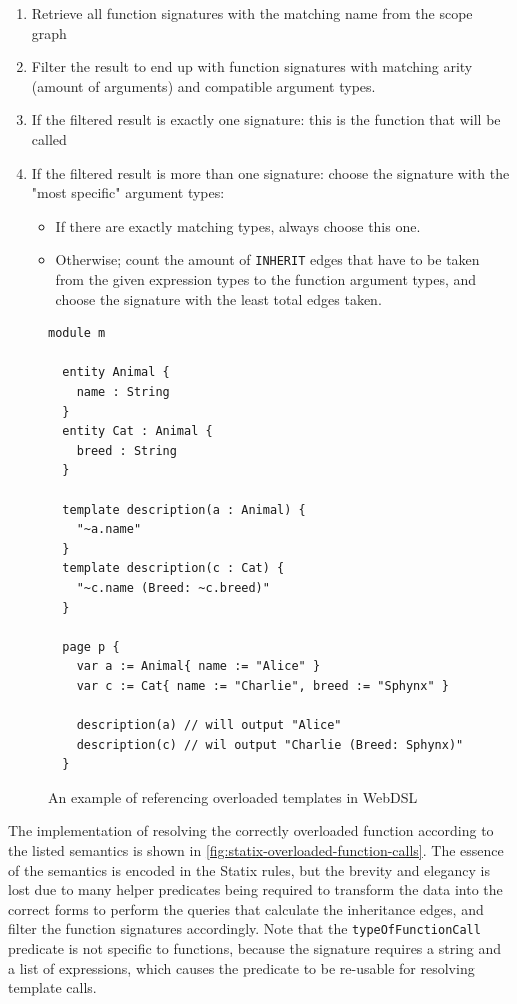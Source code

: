     \begin{enumerate}
      \item Retrieve all function signatures with the matching name from the scope graph
      \item Filter the result to end up with function signatures with matching arity (amount of arguments) and compatible argument types.
      \item If the filtered result is exactly one signature: this is the function that will be called
      \item If the filtered result is more than one signature: choose the signature with the "most specific" argument types:
      \begin{itemize}
        \item If there are exactly matching types, always choose this one.
        \item Otherwise; count the amount of \texttt{INHERIT} edges that have to be taken from the given expression types to the function argument types, and choose the signature with the least total edges taken.
      \end{itemize}
    \end{enumerate}

    \begin{figure}
      \begin{verbatim}
module m

  entity Animal {
    name : String
  }
  entity Cat : Animal {
    breed : String
  }

  template description(a : Animal) {
    "~a.name"
  }
  template description(c : Cat) {
    "~c.name (Breed: ~c.breed)"
  }

  page p {
    var a := Animal{ name := "Alice" }
    var c := Cat{ name := "Charlie", breed := "Sphynx" }

    description(a) // will output "Alice"
    description(c) // wil output "Charlie (Breed: Sphynx)"
  }
      \end{verbatim}
      \caption{\label{fig:template-overloading-referencing-example}An example of referencing overloaded templates in WebDSL}
    \end{figure}

    The implementation of resolving the correctly overloaded function according to the listed semantics is shown in \cref{fig:statix-overloaded-function-calls}. The essence of the semantics is encoded in the Statix rules, but the brevity and elegancy is lost due to many helper predicates being required to transform the data into the correct forms to perform the queries that calculate the inheritance edges, and filter the function signatures accordingly. Note that the \texttt{typeOfFunctionCall} predicate is not specific to functions, because the signature requires a string and a list of expressions, which causes the predicate to be re-usable for resolving template calls.

